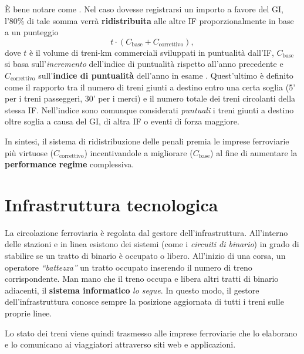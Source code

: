 \documentclass[12pt,a4paper,italian]{report}
\begin{document}
È bene notare come . Nel caso dovesse registrarsi un importo a favore
del GI, l'80\% di tale somma verrà \textbf{ridistribuita} alle altre
IF proporzionalmente in base a un punteggio
$$
t \cdot (C_\text{base} + C_\text{correttivo}),
$$
dove $t$ è il volume di treni-km commerciali sviluppati in puntualità
dall'IF, $C_\text{base}$ si basa sull'\textit{incremento} dell'indice
di puntualità rispetto all'anno precedente \cite[app.\ 5C, tabella
5a]{RfiPir} e $C_\text{correttivo}$ sull'\textbf{indice di puntualità}
dell'anno in esame \cite[app.\ 5C, tabella 5b]{RfiPir}.  Quest'ultimo
è definito come il rapporto tra il numero di treni giunti a destino
entro una certa soglia (5' per i treni passeggeri, 30' per i merci) e
il numero totale dei treni circolanti della stessa IF\@.  Nell'indice
sono comunque considerati \textit{puntuali} i treni giunti a destino
oltre soglia a causa del GI, di altra IF o eventi di forza maggiore.

In sintesi, il sistema di ridistribuzione delle penali premia le
imprese ferroviarie più virtuose ($C_\text{correttivo}$)
incentivandole a migliorare ($C_\text{base}$) al fine di aumentare la
\textbf{performance regime} complessiva.

\section{Infrastruttura tecnologica}
\label{infrastruttura_tecnologica}

La circolazione ferroviaria è regolata dal gestore
dell'infrastruttura.  All'interno delle stazioni e in linea esistono
dei sistemi (come i \textit{circuiti di binario}) in grado di
stabilire se un tratto di binario è occupato o libero.  All'inizio di
una corsa, un operatore \textit{``battezza''} un tratto occupato
inserendo il numero di treno corrispondente.  Man mano che il treno
occupa e libera altri tratti di binario adiacenti, il \textbf{sistema
    informatico} \textit{lo segue}.  In questo modo, il gestore
dell'infrastruttura conosce sempre la posizione aggiornata di tutti i
treni sulle proprie linee.

Lo stato dei treni viene quindi trasmesso alle imprese ferroviarie che
lo elaborano e lo comunicano ai viaggiatori attraverso siti web e
applicazioni.
\end{document}
